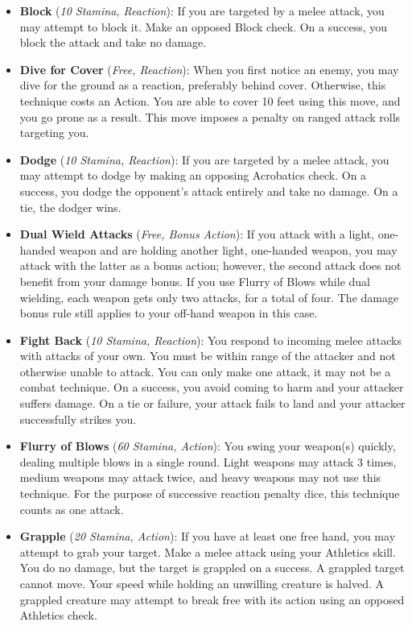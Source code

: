 \begin{itemize}
	\item \textbf{Block} (\textit{10 Stamina, Reaction}): If you are targeted by a melee attack, you may attempt to block it. Make an opposed Block check. On a success, you block the attack and take no damage.
	\item \textbf{Dive for Cover} (\textit{Free, Reaction}): When you first notice an enemy, you may dive for the ground as a reaction, preferably behind cover. Otherwise, this technique costs an Action. You are able to cover 10 feet using this move, and you go prone as a result. This move imposes a penalty on ranged attack rolls targeting you.
	\item \textbf{Dodge} (\textit{10 Stamina, Reaction}): If you are targeted by a melee attack, you may attempt to dodge by making an opposing Acrobatics check. On a success, you dodge the opponent's attack entirely and take no damage. On a tie, the dodger wins.
	\item \textbf{Dual Wield Attacks} (\textit{Free, Bonus Action}): If you attack with a light, one-handed weapon and are holding another light, one-handed weapon, you may attack with the latter as a bonus action; however, the second attack does not benefit from your damage bonus. If you use Flurry of Blows while dual wielding, each weapon gets only two attacks, for a total of four. The damage bonus rule still applies to your off-hand weapon in this case.
	\item \textbf{Fight Back} (\textit{10 Stamina, Reaction}): You respond to incoming melee attacks with attacks of your own. You must be within range of the attacker and not otherwise unable to attack. You can only make one attack, it may not be a combat technique. On a success, you avoid coming to harm and your attacker suffers damage. On a tie or failure, your attack fails to land and your attacker successfully strikes you.
	\item \textbf{Flurry of Blows} (\textit{60 Stamina, Action}): You swing your weapon(s) quickly, dealing multiple blows in a single round. Light weapons may attack 3 times, medium weapons may attack twice, and heavy weapons may not use this technique. For the purpose of successive reaction penalty dice, this technique counts as one attack.
	\item \textbf{Grapple} (\textit{20 Stamina, Action}): If you have at least one free hand, you may attempt to grab your target. Make a melee attack using your Athletics skill. You do no damage, but the target is grappled on a success. A grappled target cannot move. Your speed while holding an unwilling creature is halved. A grappled creature may attempt to break free with its action using an opposed Athletics check.

\end{itemize}
